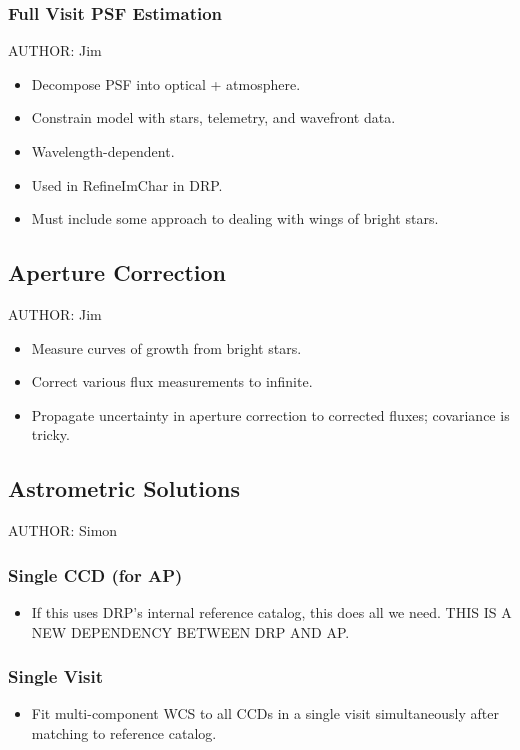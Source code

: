\subsubsection{Full Visit PSF Estimation}
AUTHOR: Jim
\begin{itemize}
\item Decompose PSF into optical + atmosphere.
\item Constrain model with stars, telemetry, and wavefront data.
\item Wavelength-dependent.
\item Used in RefineImChar in DRP.
\item Must include some approach to dealing with wings of bright stars.
\end{itemize}

\subsection{Aperture Correction}
AUTHOR: Jim
\begin{itemize}
\item Measure curves of growth from bright stars.
\item Correct various flux measurements to infinite.
\item Propagate uncertainty in aperture correction to corrected fluxes; covariance is tricky.
\end{itemize}

\subsection{Astrometric Solutions}
AUTHOR: Simon
\subsubsection{Single CCD (for AP)}
\begin{itemize}
\item If this uses DRP's internal reference catalog, this does all we need. THIS IS A NEW DEPENDENCY BETWEEN DRP AND AP.
\end{itemize}
\subsubsection{Single Visit}
\begin{itemize}
\item Fit multi-component WCS to all CCDs in a single visit simultaneously after matching to reference catalog.
\end{itemize}
